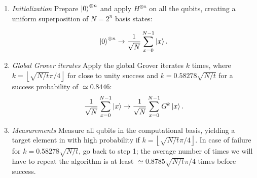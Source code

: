 \begin{enumerate}
\item \emph{Initialization}\newline
Prepare $\ket{0}^{\otimes n}$ and apply $H^{\otimes n}$ on all the qubits, creating a uniform superposition of $N=2^n$ basis states:

\begin{align*}
    \ket{0}^{\otimes n} \to \frac{1}{\sqrt{N}}\displaystyle\sum_{x=0}^{N-1} \ket{x}.
\end{align*}

\item \emph{Global Grover iterates}\newline
Apply the global Grover iterates $k$ times, where $k=\left\lfloor \sqrt{N/t}\pi/4  \right\rfloor$ for close to unity success and $k=0.58278\sqrt{N/t}$ for a success probability of $\simeq 0.8446$:
\begin{align*}
	\frac{1}{\sqrt{N}}\displaystyle\sum_{x=0}^{N-1} \ket{x} \to \frac{1}{\sqrt{N}}\displaystyle\sum_{x=0}^{N-1} G^{k}\ket{x}.
\end{align*}

\item \emph{Measurements}\newline
    Measure all qubits in the computational basis, yielding a target element in with high probability if $k=\left\lfloor\sqrt{N/t}\pi/4  \right\rfloor$. In case of failure for $k=0.58278\sqrt{N/t}$, go back to step 1; the average number of times we will have to repeat the algorithm is at least $\simeq 0.8785\sqrt{N/t}\pi/4$ times before success.

\end{enumerate}

